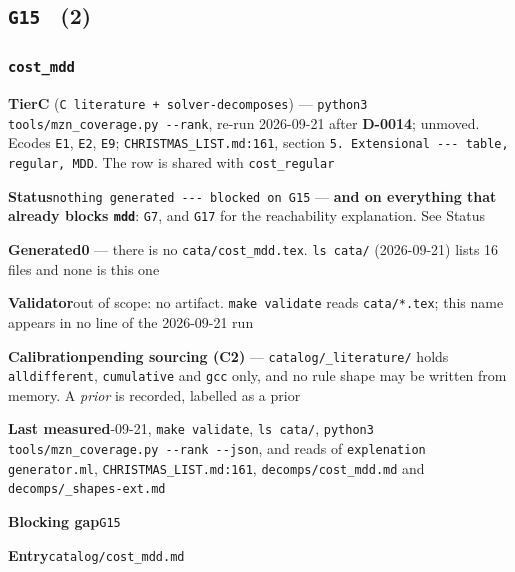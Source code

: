 \documentclass[10pt,a4paper]{article}
\newcommand{\entryfield}[2]{{\raggedright\textbf{#1}\quad #2\par}}
\begin{document}
\subsection*{\texttt{G15} \ \normalsize(2)}
\subsubsection*{\texttt{cost\_\allowbreak{}mdd}}
\label{entry:cost-mdd}
\entryfield{Tier}{\textbf{C} (\texttt{C literature + solver-\allowbreak{}decomposes}) --- \texttt{python3 tools/\allowbreak{}mzn\_\allowbreak{}coverage.\allowbreak{}py -\allowbreak{}-\allowbreak{}rank}, re-run 2026-09-21 after \textbf{D-0014}; unmoved. Ecodes \texttt{E1}, \texttt{E2}, \texttt{E9}; \texttt{CHRISTMAS\_LIST.md:161}, section \texttt{5.\allowbreak{} Extensional -\allowbreak{}-\allowbreak{}-\allowbreak{} table, regular, MDD}. The row is shared with \texttt{cost\_regular}}
\entryfield{Status}{\texttt{nothing generated -\allowbreak{}-\allowbreak{}-\allowbreak{} blocked on G15} --- \textbf{and on everything that already blocks \texttt{mdd}}: \texttt{G7}, and \texttt{G17} for the reachability explanation. See Status}
\entryfield{Generated}{\textbf{0} --- there is no \texttt{cata/cost\_mdd.tex}. \texttt{ls cata/} (2026-09-21) lists 16 files and none is this one}
\entryfield{Validator}{out of scope: no artifact. \texttt{make validate} reads \texttt{cata/*.tex}; this name appears in no line of the 2026-09-21 run}
\entryfield{Calibration}{\textbf{pending sourcing (C2)} --- \texttt{catalog/\_literature/} holds \texttt{alldifferent}, \texttt{cumulative} and \texttt{gcc} only, and no rule shape may be written from memory. A \emph{prior} is recorded, labelled as a prior}
\entryfield{Last measured}{2026-09-21, \texttt{make validate}, \texttt{ls cata/}, \texttt{python3 tools/\allowbreak{}mzn\_\allowbreak{}coverage.\allowbreak{}py -\allowbreak{}-\allowbreak{}rank -\allowbreak{}-\allowbreak{}json}, and reads of \texttt{explenation generator.ml}, \texttt{CHRISTMAS\_LIST.md:161}, \texttt{decomps/cost\_mdd.md} and \texttt{decomps/\_shapes-ext.md}}
\entryfield{Blocking gap}{\texttt{G15}}
\entryfield{Entry}{\texttt{catalog/cost\_mdd.md}}
\end{document}
